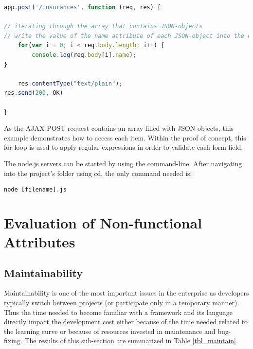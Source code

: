 \begin{lstlisting}[language=javascript,caption={Iteration through an array consisting of JSON data}]
app.post('/insurances', function (req, res) {

// iterating through the array that contains JSON-objects
// write the value of the name attribute of each JSON-object into the console
    for(var i = 0; i < req.body.length; i++) {
        console.log(req.body[i].name);
}

    res.contentType("text/plain");
res.send(200, OK)

}
\end{lstlisting}

As the AJAX POST-request contains an array filled with JSON-objects, this
example demonstrates how to access each item. Within the proof of concept, this
for-loop is used to apply regular expressions in order to validate each form
field.

The node.js servers can be started by using the command-line. After navigating
into the project’s folder using cd, the only command needed is:
\begin{lstlisting}[caption={Executing Node.js code}]
node [filename].js
\end{lstlisting}

\newpage
\section{Evaluation of Non-functional Attributes}
\label{evaluation_nonfunctional}

\subsection{Maintainability}
\label{maintainability}
Maintainability is one of the most important issues in the enterprise as
developers typically switch between projects (or participate only in a temporary
manner). Thus the time needed to become familiar with a framework and its
language directly impact the development cost either because of the time needed
related to the learning curve or because of resources invested in maintenance
and bug-fixing.
The results of this sub-section are summarized in Table \ref{tbl_maintain}.\\

